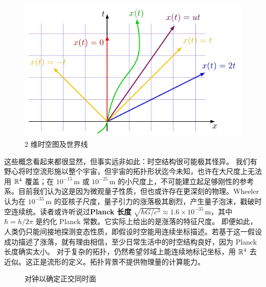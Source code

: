 \begin{figure}
    \centering
    \includegraphics[width=.5\textwidth]{fig/chpt01/worldlines.pdf}
    \caption{2 维时空图及世界线}
\end{figure}

这些概念看起来都很显然，但事实远非如此：时空结构很可能极其怪异。
我们有野心将时空流形施以整个宇宙，但宇宙的拓扑形状迄今未知，也许在大尺度上无法用 $\mathbb{R}^4$ 覆盖；在 $10^{-15}$\,m 或 $10^{-25}$\,m 的小尺度上，不可能建立起足够刚性的参考系。目前我们认为这是因为微观量子性质，但也或许存在更深刻的物理。Wheeler 认为在 $10^{-35}$\,m 的亚核子尺度，量子引力的涨落极其剧烈，产生量子泡沫，戳破时空连续统。读者或许听说过\textbf{Planck 长度} $\sqrt{\hbar G/c^3}\approx 1.6\times10^{-35}$\,m，其中 $\hbar=h/2\pi$ 是约化 Planck 常数。它实际上给出的是涨落的特征尺度。
即便如此，人类仍只能间接地探测变态性质，即假设时空能用连续坐标描述。若基于这一假设成功描述了涨落，就有理由相信，至少日常生活中的时空结构良好，因为 Planck 长度确实太小。
对于复杂的拓扑，仍然希望邻域上能连续地标记坐标，用 $\mathbb{R}^4$ 去近似。这正是流形的定义。拓扑背景不提供物理量的计算能力。


\begin{figure}[ht]
    \centering
    \qquad
    \caption{对钟以确定正交同时面}
    \label{fig:clock_syn}
\end{figure}

